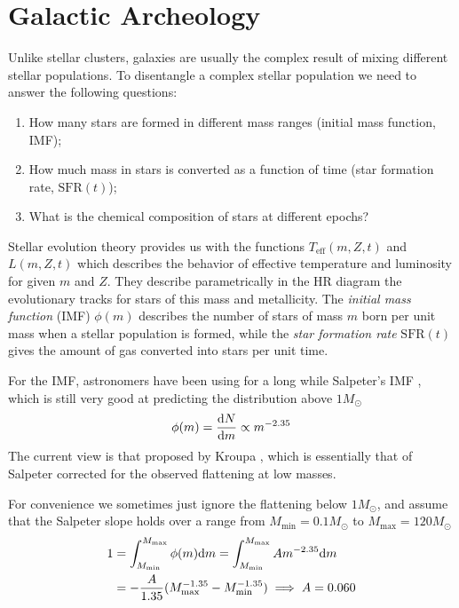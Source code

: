 \section{Galactic Archeology}

Unlike stellar clusters, galaxies are usually the complex result of mixing different stellar populations. To disentangle a complex stellar population we need to answer the following questions:
\begin{enumerate}
    \item How many stars are formed in different mass ranges (initial mass function, IMF);
    \item How much mass in stars is converted as a function of time (star formation rate, $\text{SFR}(t)$);
    \item What is the chemical composition of stars at different epochs?
\end{enumerate}
\par Stellar evolution theory provides us with the functions $T_{\text{eff}}(m,Z,t)$ and $L(m,Z,t)$ which describes the behavior of effective temperature and luminosity for given $m$ and $Z$. They describe parametrically in the HR diagram the evolutionary tracks for stars of this mass and metallicity. The \emph{initial mass function} (IMF) $\phi(m)$ describes the number of stars of mass $m$ born per unit mass when a stellar population is formed, while the \emph{star formation rate} $\text{SFR}(t)$ gives the amount of gas converted into stars per unit time.
\par For the IMF, astronomers have been using for a long while Salpeter's IMF \cite{1955ApJ...121..161S}, which is still very good at predicting the distribution above $1M_{\odot}$
\begin{equation}
    \phi(m) = \frac{\text{d}N}{\text{d}m}\propto m^{-2.35}
    \label{eq:salpeter}
\end{equation}
The current view is that proposed by Kroupa \cite{2013pss5.book..115K}, which is essentially that of Salpeter corrected for the observed flattening at low masses.
\par For convenience we sometimes just ignore the flattening below $1M_{\odot}$, and assume that the Salpeter slope holds over a range from $M_{\text{min}} = 0.1M_{\odot}$ to $M_{\text{max}}=120M_{\odot}$
\begin{align*}
    1 &= \int_{M_{\text{min}}}^{M_{\text{max}}}\phi(m)\text{d}m = \int_{M_{\text{min}}}^{M_{\text{max}}} A m^{-2.35}\text{d}m\\
    &= -\frac{A}{1.35}(M_{\text{max}}^{-1.35}-M_{\text{min}}^{-1.35}) \implies A = 0.060
\end{align*}
